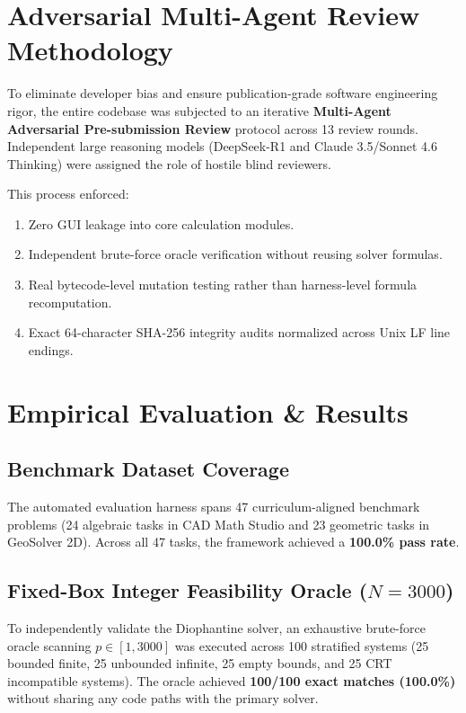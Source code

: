 \documentclass[conference]{IEEEtran}
\begin{document}
\section{Adversarial Multi-Agent Review Methodology}
To eliminate developer bias and ensure publication-grade software engineering rigor, the entire codebase was subjected to an iterative \textbf{Multi-Agent Adversarial Pre-submission Review} protocol across 13 review rounds. Independent large reasoning models (DeepSeek-R1 and Claude 3.5/Sonnet 4.6 Thinking) were assigned the role of hostile blind reviewers. 

This process enforced:
\begin{enumerate}
    \item Zero GUI leakage into core calculation modules.
    \item Independent brute-force oracle verification without reusing solver formulas.
    \item Real bytecode-level mutation testing rather than harness-level formula recomputation.
    \item Exact 64-character SHA-256 integrity audits normalized across Unix LF line endings.
\end{enumerate}

\section{Empirical Evaluation \& Results}

\subsection{Benchmark Dataset Coverage}
The automated evaluation harness spans 47 curriculum-aligned benchmark problems (24 algebraic tasks in CAD Math Studio and 23 geometric tasks in GeoSolver 2D). Across all 47 tasks, the framework achieved a \textbf{100.0\% pass rate}.

\subsection{Fixed-Box Integer Feasibility Oracle ($N=3000$)}
To independently validate the Diophantine solver, an exhaustive brute-force oracle scanning $p \in [1, 3000]$ was executed across 100 stratified systems (25 bounded finite, 25 unbounded infinite, 25 empty bounds, and 25 CRT incompatible systems). The oracle achieved \textbf{100/100 exact matches (100.0\%)} without sharing any code paths with the primary solver.
\end{document}
